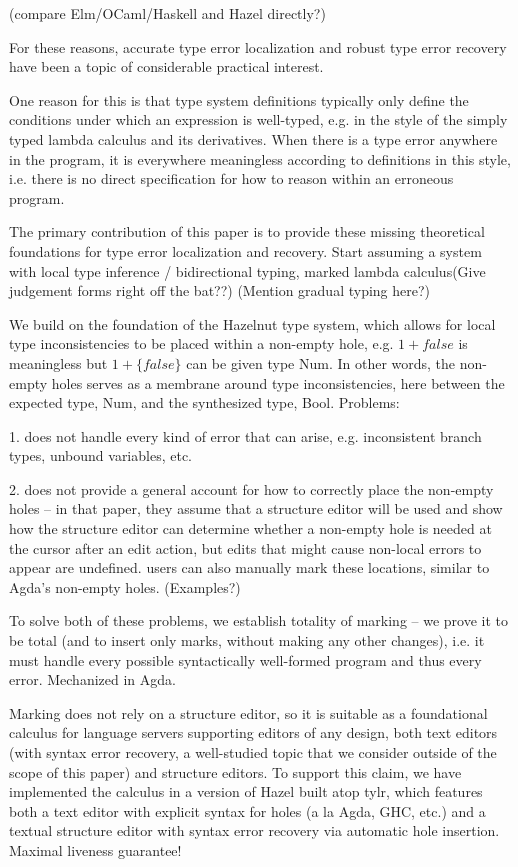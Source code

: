 (compare Elm/OCaml/Haskell and Hazel directly?)



For these reasons, accurate type error localization and robust type error recovery have been a topic of considerable practical interest. 



One reason for this is 
that type system definitions typically only define the conditions under which an expression is well-typed, e.g. in the style of the simply typed lambda calculus and its derivatives. When there is a type error anywhere in the program, it is everywhere meaningless according to definitions in this style, i.e. there is no direct specification for how to reason within an erroneous program. 

The primary contribution of this paper is to provide these missing theoretical foundations for type error localization and recovery. 
Start assuming a system with local type inference / bidirectional typing, marked lambda calculus(Give judgement forms right off the bat??) 
(Mention gradual typing here?)

We build on the foundation of the Hazelnut type system, which allows for local type inconsistencies to be placed within a non-empty hole, 
e.g. $1 + false$ is meaningless but $1 + \{false\}$ can be given type Num. In other words, the non-empty holes serves as a membrane around type inconsistencies, here between the expected type, Num, and the synthesized type, Bool. Problems:

1. does not handle every kind of error that can arise, e.g. inconsistent branch types, unbound variables, etc.

2. does not provide a general account for how to correctly place the non-empty holes -- in that paper, they assume that a structure editor will be used and show how the structure editor can determine whether a non-empty hole is needed at the cursor after an edit action, but edits that might cause non-local errors to appear are undefined. users can also manually mark these locations, similar to Agda's non-empty holes. (Examples?)

To solve both of these problems, we establish totality of marking -- we prove it to be total (and to insert only marks, without making any other changes), i.e. it must handle 
every possible syntactically well-formed program and thus every error. Mechanized in Agda.

Marking does not rely on a structure editor, so it is suitable as a foundational calculus for language servers supporting editors of any 
design, both text editors (with syntax error recovery, a well-studied topic that we consider outside of the scope of this paper) and structure editors. To support this claim, we have implemented the calculus in a version of Hazel built atop tylr, which features both a text editor with explicit syntax for holes (a la Agda, GHC, etc.) and a textual structure editor with syntax error recovery via automatic hole insertion. Maximal liveness guarantee! 

